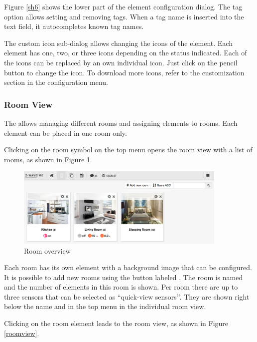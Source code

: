 Figure \ref{sh6} shows the lower part of the element configuration dialog. The tag option 
allows setting and removing tags. When a tag name is inserted into the text field, it 
autocompletes known tag names.

The custom icon sub-dialog allows changing the icons of the element. Each element has one, 
two, or three icons depending on the status indicated. Each of the icons can be replaced 
by an own individual icon. Just click on the pencil button to change the icon. To 
download more icons, refer to the customization section in the configuration menu.

\subsubsection{Room View}

The \zwshui allows managing different rooms and assigning elements to 
rooms. Each element can be placed in one room only.

Clicking on the room symbol on the top menu opens the room view with a list of rooms, 
as shown in Figure \ref{roomover}.

\begin{figure}
\begin{center}
\includegraphics[width=0.9\textwidth]{pngs/cap4/roomover.png}
\caption{Room overview}
\label{roomover}
\end{center}
\end{figure}

Each room has its own element with a background image that can be configured. It is 
possible to add new rooms using the button labeled .
The room is named and the number of elements in this room is shown. Per room there 
are up to three sensors that can be selected as ``quick-view sensors’’. They are shown 
right below the name and in the top menu in the individual room view.

Clicking on the room element leads to the room view, as shown in Figure \ref{roomview}.

